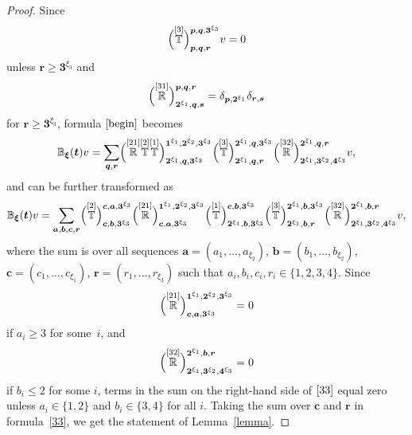\documentclass[10pt,a4paper]{amsart}
\numberwithin{equation}{section}
\begin{document}
\begin{proof}
Since
\[
\Bigl( \overset{[3]}{\mathbb{T}} \Big)^{\boldsymbol{p},\boldsymbol{q},\boldsymbol{3}^{\xi_3}}_{\boldsymbol{p},\boldsymbol{q},\boldsymbol{r}} v=0
\]
 unless $\boldsymbol{r}\geq \boldsymbol{3}^{\xi_3}$ and
\[
\Bigl(\overset{[31]}{\mathbb{R}} \Big)^{\boldsymbol{p},\boldsymbol{q},\boldsymbol{r}}_{\boldsymbol{2}^{\xi_1}, \boldsymbol{q},\boldsymbol{s}}=\delta_{\boldsymbol{p},\boldsymbol{2}^{\xi_1}} \delta_{\boldsymbol{{r}},\boldsymbol{{s}}}
\]
for $\boldsymbol{r}\geq \boldsymbol{3}^{\xi_3}$, formula $\eqref{begin}$ becomes
\begin{equation*}
{\mathbb{B}}_{\boldsymbol{\xi}}(\boldsymbol{t})v=\sum_{\boldsymbol{q},\boldsymbol{r}}
\Bigl( \overset{[21]}{\mathbb{R}} \overset{[2]}{\mathbb{T}} \overset{[1]}{\mathbb{T}} \Big)^{\boldsymbol{1}^{\xi_1},\boldsymbol{2}^{\xi_2}, \boldsymbol{3}^{\xi_3}}_{\boldsymbol{2}^{\xi_1},\boldsymbol{q},\boldsymbol{3}^{\xi_3}}
\Bigl( \overset{[3]}{\mathbb{T}} \Big)^{\boldsymbol{2}^{\xi_1},\boldsymbol{q},\boldsymbol{3}^{\xi_3}}_{\boldsymbol{2}^{\xi_1},\boldsymbol{q},\boldsymbol{r}} \Bigl( \overset{[32]}{\mathbb{R}} \Big)^{\boldsymbol{2}^{\xi_1},\boldsymbol{q},\boldsymbol{r}}_{\boldsymbol{2}^{\xi_1},\boldsymbol{3}^{\xi_2},\boldsymbol{4}^{\xi_3}}v,
\end{equation*}
and can be further transformed as
\begin{equation}\label{33}
{\mathbb{B}}_{\boldsymbol{\xi}}(\boldsymbol{t})v= \sum_{\boldsymbol{a},\boldsymbol{b},\boldsymbol{c},\boldsymbol{r}}
\Bigl(\overset{[2]}{\mathbb{T}} \Big)^{\boldsymbol{c},\boldsymbol{a},\boldsymbol{3}^{\xi_3}}_{\boldsymbol{c},\boldsymbol{b},\boldsymbol{3}^{\xi_3}}
\Bigl(\overset{[21]}{\mathbb{R}} \Big)^{\boldsymbol{1}^{\xi_1},\boldsymbol{2}^{\xi_2},\boldsymbol{3}^{\xi_3}}_{\boldsymbol{c},\boldsymbol{a},\boldsymbol{3}^{\xi_3}}
\Bigl(\overset{[1]}{\mathbb{T}} \Big)^{\boldsymbol{c},\boldsymbol{b},\boldsymbol{3}^{\xi_3}}_{\boldsymbol{2}^{\xi_1},\boldsymbol{b},\boldsymbol{3}^{\xi_3}} \Bigl( \overset{[3]}{\mathbb{T}} \Big)^{\boldsymbol{2}^{\xi_1},\boldsymbol{b},\boldsymbol{3}^{\xi_3}}_{\boldsymbol{2}^{\xi_1},\boldsymbol{b},\boldsymbol{r}} \Bigl( \overset{[32]}{\mathbb{R}} \Big)^{\boldsymbol{2}^{\xi_1},\boldsymbol{b},\boldsymbol{r}}_{\boldsymbol{2}^{\xi_1},\boldsymbol{3}^{\xi_2},\boldsymbol{4}^{\xi_3}}v,
\end{equation}
where the sum is over all sequences $\boldsymbol{a}=(a_1,\dots,a_{\xi_2})$, $\boldsymbol{b}=(b_1,\dots,b_{\xi_2})$, $\boldsymbol{c}=(c_1,\dots, c_{\xi_1})$, $\boldsymbol{r}=(r_1,\dots,r_{\xi_3})$ such that $a_i,b_i,c_i,r_i\in\{1,2,3,4\}$. Since
\[
\Bigl(\overset{[21]}{\mathbb{R}} \Bigr)^{\boldsymbol{1}^{\xi_1},\boldsymbol{2}^{\xi_2},\boldsymbol{3}^{\xi_3}}_{\boldsymbol{c},\boldsymbol{a},\boldsymbol{3}^{\xi_3}}=0
\]
 if $a_i\geq3$ for some~$i$, and
 \[
 \Bigl( \overset{[32]}{\mathbb{R}} \Bigr)^{\boldsymbol{2}^{\xi_1},\boldsymbol{b},\boldsymbol{r}}_{\boldsymbol{2}^{\xi_1},\boldsymbol{3}^{\xi_2},\boldsymbol{4}^{\xi_3}}=0
 \]
 if $b_i\leq 2$ for some $i$, terms in the sum on the right-hand side of $\eqref{33}$ equal zero unless $a_i\in\{1,2\}$ and $b_i\in \{3,4\}$ for all $i$. Taking the sum over $\boldsymbol{c}$ and $\boldsymbol{r}$ in formula~\eqref{33}, we get the statement of Lemma~\ref{lemma}.
\end{proof}
\end{document}
